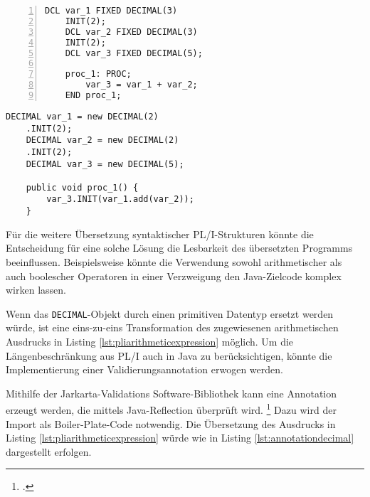 \begin{minipage}[b]{0.48\linewidth}{\newline}
	\centering
	\lstset{language=PL/I}
	\begin{lstlisting}[frame=single, numbers=left, mathescape,%
		caption={Transformation DECIMAL}, label={lst:pliarithmeticexpression}]
	DCL var_1 FIXED DECIMAL(3) 
	INIT(2);
	DCL var_2 FIXED DECIMAL(3) 
	INIT(2);
	DCL var_3 FIXED DECIMAL(5);
		
	proc_1: PROC;
		var_3 = var_1 + var_2;
	END proc_1;
	\end{lstlisting}
\end{minipage}
\hspace{0.5cm}
\begin{minipage}[b]{0.48\linewidth}
	\centering
	\lstset{language=Java}
	\begin{lstlisting}[frame=single, mathescape,%
		title={" "}]
	DECIMAL var_1 = new DECIMAL(2)
	.INIT(2);
	DECIMAL var_2 = new DECIMAL(2)
	.INIT(2);
	DECIMAL var_3 = new DECIMAL(5);
		
	public void proc_1() {
		var_3.INIT(var_1.add(var_2));
	}
	\end{lstlisting}
\end{minipage}

Für die weitere Übersetzung syntaktischer PL/I-Strukturen könnte die Entscheidung für eine solche Lösung die Lesbarkeit des übersetzten Programms beeinflussen. Beispielsweise könnte die Verwendung sowohl arithmetischer als auch boolescher Operatoren in einer Verzweigung den Java-Zielcode komplex wirken lassen. 

Wenn das \verb+DECIMAL+-Objekt durch einen primitiven Datentyp ersetzt werden würde, ist eine eins-zu-eins Transformation des zugewiesenen arithmetischen Ausdrucks in Listing \ref{lst:pliarithmeticexpression} möglich. Um die Längenbeschränkung aus PL/I auch in Java zu berücksichtigen, könnte die Implementierung einer Validierungsannotation erwogen werden.

Mithilfe der Jarkarta-Validations Software-Bibliothek kann eine Annotation erzeugt werden, die mittels Java-Reflection überprüft wird. \footcite[Vgl. ][]{jakarta}
Dazu wird der Import als Boiler-Plate-Code  notwendig. 
Die Übersetzung des Ausdrucks in Listing \ref{lst:pliarithmeticexpression} würde wie in Listing \ref{lst:annotationdecimal} dargestellt erfolgen.

